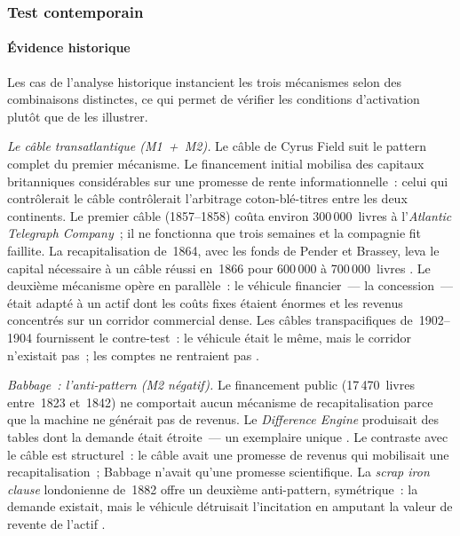 \subsubsection{Test contemporain}

\paragraph{Évidence historique}

Les cas de l'analyse historique instancient les trois mécanismes selon des combinaisons distinctes, ce qui permet de vérifier les conditions d'activation plutôt que de les illustrer.

\emph{Le câble transatlantique (M1~+~M2).} Le câble de Cyrus Field suit le pattern complet du premier mécanisme. Le financement initial mobilisa des capitaux britanniques considérables sur une promesse de rente informationnelle~: celui qui contrôlerait le câble contrôlerait l'arbitrage coton-blé-titres entre les deux continents. Le premier câble (1857--1858) coûta environ 300\,000~livres à l'\emph{Atlantic Telegraph Company}~; il ne fonctionna que trois semaines et la compagnie fit faillite. La recapitalisation de~1864, avec les fonds de Pender et Brassey, leva le capital nécessaire à un câble réussi en~1866 pour 600\,000 à 700\,000~livres \parencite{gordon_thread_2002}. Le deuxième mécanisme opère en parallèle~: le véhicule financier~--- la concession~--- était adapté à un actif dont les coûts fixes étaient énormes et les revenus concentrés sur un corridor commercial dense. Les câbles transpacifiques de~1902--1904 fournissent le contre-test~: le véhicule était le même, mais le corridor n'existait pas~; les comptes ne rentraient pas \parencite{muller_telegraph_2015}.

\emph{Babbage~: l'anti-pattern (M2 négatif).} Le financement public (17\,470~livres entre~1823 et~1842) ne comportait aucun mécanisme de recapitalisation parce que la machine ne générait pas de revenus. Le \emph{Difference Engine} produisait des tables dont la demande était étroite~--- un exemplaire unique \parencite{swade_difference_2001}. Le contraste avec le câble est structurel~: le câble avait une promesse de revenus qui mobilisait une recapitalisation~; Babbage n'avait qu'une promesse scientifique. La \emph{scrap iron clause} londonienne de~1882 offre un deuxième anti-pattern, symétrique~: la demande existait, mais le véhicule détruisait l'incitation en amputant la valeur de revente de l'actif \parencite{hughes_networks_1983}.

